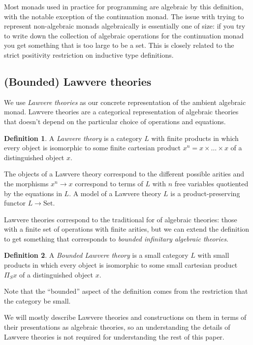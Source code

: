 \documentclass[acmsmall, screen, nonacm]{acmart}
\theoremstyle{definition}
\newtheorem{definition}{Definition}[section]
\newcommand{\setc}{\mathrm{Set}}
\begin{document}
Most monads used in practice for programming are algebraic by this
definition, with the notable exception of the continuation monad. The
issue with trying to represent non-algebraic monads algebraically is
essentially one of size: if you try to write down the collection of
algebraic operations for the continuation monad you get something that
is too large to be a set. This is closely related to the strict
positivity restriction on inductive type definitions.

\subsection{(Bounded) Lawvere theories}

We use \emph{Lawvere theories} as our concrete representation of the
ambient algebraic monad. Lawvere theories are a categorical
representation of algebraic theories that doesn't depend on the
particular choice of operations and equations.

\begin{definition}
  A \emph{Lawvere theory} is a category $L$ with finite products in
  which every object is isomorphic to some finite cartesian product
  $x^n = x \times \ldots \times x$ of a distinguished object $x$.
\end{definition}
The objects of a Lawvere theory correspond to the different possible
arities and the morphisms $x^n \rightarrow x$ correspond to terms
of $L$ with $n$ free variables quotiented by the equations in $L$. A
model of a Lawvere theory $L$ is a product-preserving functor
$L \rightarrow \setc$.

Lawvere theories correspond to the traditional for of algebraic
theories: those with a finite set of operations with finite arities, but
we can extend the definition to get something that corresponds to
\emph{bounded infinitary algebraic theories}.
\begin{definition}
  A \emph{Bounded Lawvere theory} is a small category $L$ with small
  products in which every object is isomorphic to some small cartesian
  product $\Pi_S x$ of a distinguished object $x$.
\end{definition}
Note that the ``bounded'' aspect of the definition comes from the
restriction that the category be small.

We will mostly describe Lawvere theories and constructions on them in
terms of their presentations as algebraic theories, so an understanding
the details of Lawvere theories is not required for understanding the
rest of this paper.
\end{document}
